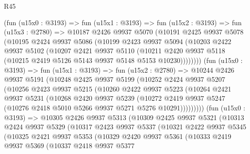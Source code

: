 \begin{lexlean}{R45}
\begin{coremodule}
        (fun (u15x0 : @3193) =>
        fun (u15x1 : @3193) =>
        fun (u15x2 : @3193) =>
        fun (u15x3 : @2780) =>
        @10187
          @2426
          @9937
          @5070
          (@10191
            @2425
            @9937
            @5078
            (@10195
              @2424
              @9937
              @5086
              (@10199
                @2423
                @9937
                @5094
                (@10203
                  @2422
                  @9937
                  @5102
                  (@10207
                    @2421
                    @9937
                    @5110
                    (@10211
                      @2420
                      @9937
                      @5118
                      (@10215 @2419 @5126 @5143 @9937 @5148 @5153 @10230))))))))
        (fun (u15x0 : @3193) =>
        fun (u15x1 : @3193) =>
        fun (u15x2 : @2780) =>
        @10244
          @2426
          @9937
          @5191
          (@10248
            @2425
            @9937
            @5199
            (@10252
              @2424
              @9937
              @5207
              (@10256
                @2423
                @9937
                @5215
                (@10260
                  @2422
                  @9937
                  @5223
                  (@10264
                    @2421
                    @9937
                    @5231
                    (@10268
                      @2420
                      @9937
                      @5239
                      (@10272
                        @2419
                        @9937
                        @5247
                        (@10276 @2418 @5010 @5266 @9937 @5271 @5276 @10291)))))))))
        (fun (u15x0 : @3193) =>
        @10305
          @2426
          @9937
          @5313
          (@10309
            @2425
            @9937
            @5321
            (@10313
              @2424
              @9937
              @5329
              (@10317
                @2423
                @9937
                @5337
                (@10321
                  @2422
                  @9937
                  @5345
                  (@10325
                    @2421
                    @9937
                    @5353
                    (@10329
                      @2420
                      @9937
                      @5361
                      (@10333
                        @2419
                        @9937
                        @5369
                        (@10337
                          @2418
                          @9937
                          @5377

\end{coremodule}
\end{lexlean}
